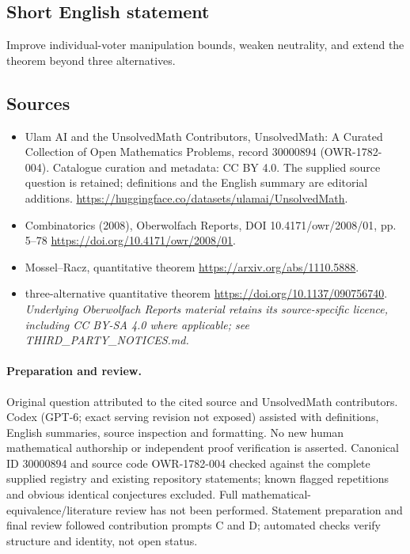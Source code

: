 \documentclass[11pt]{article}
\begin{document}
\subsection{Short English statement}
Improve individual-voter manipulation bounds, weaken neutrality, and extend the theorem beyond three alternatives.
\subsection{Sources}
\begin{itemize}
\item[\hypertarget{source:30000894:1}{S1}] Ulam AI and the UnsolvedMath Contributors, UnsolvedMath: A Curated Collection of Open Mathematics Problems, record 30000894 (OWR-1782-004). Catalogue curation and metadata: CC BY 4.0. The supplied source question is retained; definitions and the English summary are editorial additions.
\url{https://huggingface.co/datasets/ulamai/UnsolvedMath}.
\item[\hypertarget{source:30000894:2}{S2}] Combinatorics (2008), Oberwolfach Reports, DOI 10.4171/owr/2008/01, pp. 5--78
\url{https://doi.org/10.4171/owr/2008/01}.
\item[\hypertarget{source:30000894:3}{S3}] Mossel--Racz, quantitative theorem
\url{https://arxiv.org/abs/1110.5888}.
\item[\hypertarget{source:30000894:4}{S4}] three-alternative quantitative theorem
\url{https://doi.org/10.1137/090756740}.
\textit{Underlying Oberwolfach Reports material retains its source-specific licence, including CC BY-SA 4.0 where applicable; see THIRD\_PARTY\_NOTICES.md.}
\end{itemize}
\paragraph{Preparation and review.}
Original question attributed to the cited source and UnsolvedMath contributors. Codex (GPT-6; exact serving revision not exposed) assisted with definitions, English summaries, source inspection and formatting. No new human mathematical authorship or independent proof verification is asserted. Canonical ID 30000894 and source code OWR-1782-004 checked against the complete supplied registry and existing repository statements; known flagged repetitions and obvious identical conjectures excluded. Full mathematical-equivalence/literature review has not been performed. Statement preparation and final review followed contribution prompts C and D; automated checks verify structure and identity, not open status.
\label{end:30000894}
\end{document}
